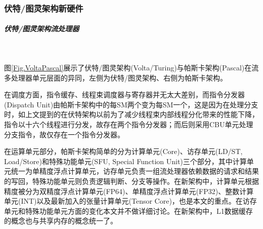 \subsubsection{伏特/图灵架构新硬件}     
\subparagraph{伏特/图灵架构流处理器}~{}
\par 图\ref{Fig.VoltaPascal}展示了伏特/图灵架构(Volta/Turing)与帕斯卡架构(Pascal)在流多处理器单元层面的异同，左侧为伏特/图灵架构、右侧为帕斯卡架构。
\par 在调度方面，指令缓存、线程束调度器与寄存器并无太大差别，而指令分发器(Dispatch Unit)由帕斯卡架构中的每SM两个变为每SM一个，这是因为在处理分支时，如上文提到的在伏特架构以前为了减少线程束内部线程分化带来的性能下降，指令以十六个线程进行分发，故存在两个指令分发器；而后则采用CBU单元处理分支指令，故仅存在一个指令分发器。
\par 在运算单元部分，帕斯卡架构简单的分为计算单元(Core)、访存单元(LD/ST, Load/Store)和特殊功能单元(SFU, Special Function Unit)三个部分，其中计算单元统一为单精度浮点计算单元，访存单元负责一组流处理器依赖数据的请求和结果的写回，特殊功能单元则负责逻辑判断、分支等操作。在新架构中，计算单元根据精度被分为双精度浮点计算单元(FP64)、单精度浮点计算单元(FP32)、整数计算单元(INT)以及最新加入的张量计算单元(Tensor Core)，也是本文的重点。在访存单元和特殊功能单元方面的变化本文并不做详细讨论。在新架构中，L1数据缓存的概念也与共享内存的概念统一了。

